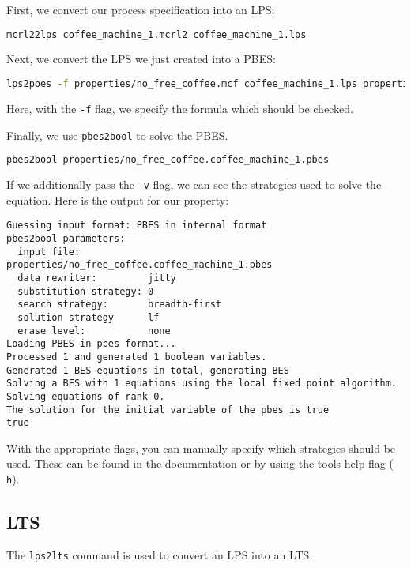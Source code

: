\documentclass{clseminar}
\begin{document}
  First, we convert our process specification into an LPS:

  \begin{lstlisting}[language=Bash]
mcrl22lps coffee_machine_1.mcrl2 coffee_machine_1.lps
  \end{lstlisting}

  Next, we convert the LPS we just created into a PBES:

  \begin{lstlisting}[language=Bash]
lps2pbes -f properties/no_free_coffee.mcf coffee_machine_1.lps properties/no_free_coffee.coffee_machine_1.pbes
  \end{lstlisting}

  Here, with the \texttt{-f} flag, we specify the formula which should be checked.

  Finally, we use \texttt{pbes2bool} to solve the PBES.

  \begin{lstlisting}[language=Bash]
pbes2bool properties/no_free_coffee.coffee_machine_1.pbes
  \end{lstlisting}

  If we additionally pass the \texttt{-v} flag, we can see the strategies used to solve the equation. Here is the output for our property:

  \begin{lstlisting}
Guessing input format: PBES in internal format
pbes2bool parameters:
  input file:            properties/no_free_coffee.coffee_machine_1.pbes
  data rewriter:         jitty
  substitution strategy: 0
  search strategy:       breadth-first
  solution strategy      lf
  erase level:           none
Loading PBES in pbes format...
Processed 1 and generated 1 boolean variables.
Generated 1 BES equations in total, generating BES
Solving a BES with 1 equations using the local fixed point algorithm.
Solving equations of rank 0.
The solution for the initial variable of the pbes is true
true
  \end{lstlisting}

  With the appropriate flags, you can manually specify which strategies should be used. These can be found in the documentation \cite{mcrl2doc} or by using the tools help flag (\texttt{-h}).

  \subsection{LTS}

  The \texttt{lps2lts} command is used to convert an LPS into an LTS.
\end{document}
